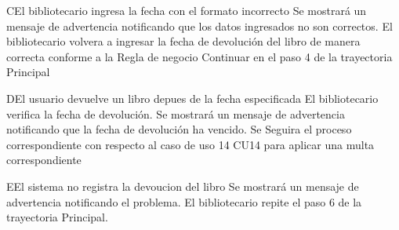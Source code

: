 \begin{UCtrayectoriaA}{C}{El bibliotecario ingresa la fecha con el formato incorrecto}
			\UCpaso[\UCsist] Se mostrará un mensaje de advertencia notificando que los datos ingresados no son correctos. 
			\UCpaso[\UCactor] El bibliotecario volvera a ingresar la fecha de devolución del libro de manera correcta conforme a la Regla de negocio 
			\UCpaso[\UCsist]Continuar en el paso 4 de la trayectoria Principal 
		\end{UCtrayectoriaA}




		\begin{UCtrayectoriaA}{D}{El usuario devuelve un libro depues de la fecha especificada}
			\UCpaso[\UCactor] El bibliotecario verifica la fecha de devolución.
			\UCpaso[\UCsist] Se mostrará un mensaje de advertencia notificando que la fecha de devolución ha vencido. 
			\UCpaso[\UCsist] Se Seguira el proceso correspondiente con respecto al caso de uso 14 CU14 para aplicar una multa correspondiente
		\end{UCtrayectoriaA}


		\begin{UCtrayectoriaA}{E}{El sistema no registra la devoucion del libro}
			\UCpaso[\UCsist] Se mostrará un mensaje de advertencia notificando el problema. 
			\UCpaso[\UCactor]El bibliotecario repite el paso 6 de la trayectoria Principal.
		\end{UCtrayectoriaA}
